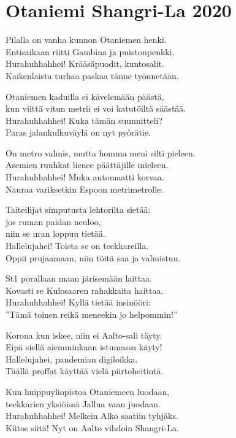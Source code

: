 \section{Otaniemi Shangri-La 2020}
\vspace*{-0.4cm}
Pilalla on vanha kunnon Otaniemen henki.\\
Entisaikaan riitti Gambina ja puistonpenkki.\\
Hurahuhhahhei! Krääsäpuodit, kuntosalit.\\
Kaikenlaista turhaa paskaa tänne työnnetään.

Otaniemen kaduilla ei kävelemään päästä,\\
kun viittä vitun metrii ei voi katutöiltä säästää.\\
Hurahuhhahhei! Kuka tämän suunnitteli?\\
Paras jalankulkuväylä on nyt pyörätie.

On metro valmis, mutta homma meni silti pieleen.\\
Asemien ruuhkat lienee päättäjille mieleen.\\
Hurahuhhahhei! Muka automaatti korvaa.\\
Nauraa variksetkin Espoon metrimetrolle.

Taiteilijat simputusta lehtorilta sietää:\\
jos ruman paidan neuloo,\\
niin se uran loppuu tietää.\\
Hallelujahei! Toista se on teekkareilla.\\
Oppii prujaamaan, niin töitä saa ja valmistuu.

St1 porallaan maan järisemään laittaa.\\
Kovasti se Kulosaaren rahakkaita haittaa.\\
Hurahuhhahhei! Kyllä tietää insinööri:\\
”Tämä toinen reikä meneekin jo helpommin!”

Korona kun iskee, niin ei Aalto-sali täyty.\\
Eipä siellä aiemminkaan istumassa käyty!\\
Hallelujahei, pandemian digiloikka.\\
Täällä proffat käyttää vielä piirtoheitintä.

Kun huippuyliopistoa Otaniemeen luodaan,\\
teekkarien yksiöissä Jallua vaan juodaan.\\
Hurahuhhahhei! Melkein Alko saatiin tyhjäks.\\
Kiitos siitä! Nyt on Aalto vihdoin Shangri-La.